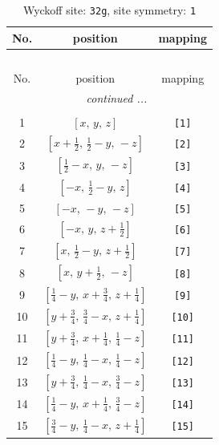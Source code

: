\documentclass[fleqn,8pt]{jsarticle}
\begin{document}
\renewcommand{\arraystretch}{1.2}
\begin{longtable}{ccc}
\caption{Wyckoff site: {\tt 32g}, site symmetry: {\tt 1}}
 \\
 \hline \hline
No. & position & mapping \\ \hline \endfirsthead

\multicolumn{2}{l}{\tablename\ \thetable{}} \\
 \hline \hline
No. & position & mapping \\ \hline \endhead

 \hline \hline
\multicolumn{2}{r}{\footnotesize\it continued ...} \\ \endfoot

 \hline \hline
\multicolumn{2}{r}{} \\ \endlastfoot

1 & $\left[ x,\, y,\, z \right]$ & {\tt [1]} \\ \hline
2 & $\left[ x + \frac{1}{2},\, \frac{1}{2} - y,\, - z \right]$ & {\tt [2]} \\ \hline
3 & $\left[ \frac{1}{2} - x,\, y,\, - z \right]$ & {\tt [3]} \\ \hline
4 & $\left[ - x,\, \frac{1}{2} - y,\, z \right]$ & {\tt [4]} \\ \hline
5 & $\left[ - x,\, - y,\, - z \right]$ & {\tt [5]} \\ \hline
6 & $\left[ - x,\, y,\, z + \frac{1}{2} \right]$ & {\tt [6]} \\ \hline
7 & $\left[ x,\, \frac{1}{2} - y,\, z + \frac{1}{2} \right]$ & {\tt [7]} \\ \hline
8 & $\left[ x,\, y + \frac{1}{2},\, - z \right]$ & {\tt [8]} \\ \hline
9 & $\left[ \frac{1}{4} - y,\, x + \frac{3}{4},\, z + \frac{1}{4} \right]$ & {\tt [9]} \\ \hline
10 & $\left[ y + \frac{3}{4},\, \frac{3}{4} - x,\, z + \frac{1}{4} \right]$ & {\tt [10]} \\ \hline
11 & $\left[ y + \frac{3}{4},\, x + \frac{1}{4},\, \frac{1}{4} - z \right]$ & {\tt [11]} \\ \hline
12 & $\left[ \frac{1}{4} - y,\, \frac{1}{4} - x,\, \frac{1}{4} - z \right]$ & {\tt [12]} \\ \hline
13 & $\left[ y + \frac{3}{4},\, \frac{1}{4} - x,\, \frac{3}{4} - z \right]$ & {\tt [13]} \\ \hline
14 & $\left[ \frac{1}{4} - y,\, x + \frac{1}{4},\, \frac{3}{4} - z \right]$ & {\tt [14]} \\ \hline
15 & $\left[ \frac{3}{4} - y,\, \frac{1}{4} - x,\, z + \frac{1}{4} \right]$ & {\tt [15]} \\ \hline

\end{longtable}
\end{document}
